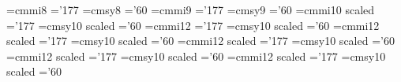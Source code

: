 \font\eighti=cmmi8 \skewchar\eighti='177
\font\eightsy=cmsy8 \skewchar\eightsy='60
%
%
\font\ninei=cmmi9 \skewchar\ninei='177
\font\ninesy=cmsy9 \skewchar\ninesy='60
%
%
\font\eleveni=cmmi10 scaled \magstephalf \skewchar\eleveni='177
\font\elevensy=cmsy10 scaled \magstephalf \skewchar\elevensy='60
%
%
\font\twelvei=cmmi12 \skewchar\twelvei='177
\font\twelvesy=cmsy10 scaled  \skewchar\twelvesy='60
%
%
\font\frti=cmmi12 scaled  \skewchar\frti='177
\font\frtsy=cmsy10 scaled  \skewchar\frtsy='60
%
%
\font\svti=cmmi12 scaled  \skewchar\svti='177
\font\svtsy=cmsy10 scaled  \skewchar\svtsy='60
%
%
\font\twtyi=cmmi12 scaled  \skewchar\twtyi='177
\font\twtysy=cmsy10 scaled \skewchar\twtysy='60
%
%
\font\twfvi=cmmi12 scaled  \skewchar\twfvi='177
\font\twfvsy=cmsy10 scaled  \skewchar\twfvsy='60
%
%
\def\Twfvpoint{\normalbaselineskip=30pt
  \def\rm{\fam0\twfvrm}%
  \def\it{\fam\itfam\twfvit}%
  \def\sl{\fam\slfam\twfvsl}%
  \def\bf{\fam\bffam\twfvbf}%
  \def\smc{\twfvrm}%
  \def\mit{\fam 1}%
  \def\cal{\fam 2}%
  \textfont0=\twfvrm   \scriptfont0=\twtyrm   \scriptscriptfont0=\svtrm
  \textfont1=\twfvi    \scriptfont1=\twtyi    \scriptscriptfont1=\svti
  \textfont2=\twfvsy   \scriptfont2=\twtysy   \scriptscriptfont2=\svtsy
  \textfont3=\tenex   \scriptfont3=\tenex     \scriptscriptfont3=\tenex
  \textfont\itfam=\twfvit \scriptfont\itfam=\twtyit
  \textfont\slfam=\twfvsl \scriptfont\slfam=\twtysl
  \textfont\bffam=\twfvbf \scriptfont\bffam=\twtybf
  \scriptscriptfont\bffam=\twtybf
  \setbox\strutbox=\hbox{\vrule height 22pt depth 8pt width 0pt}%
  \def\tt{\twfvtt}\normalbaselines\rm
}
\def\twfvpoint{\Twfvpoint}
%
\def\Twtypoint{\normalbaselineskip=25pt
  \def\rm{\fam0\twtyrm}%
  \def\it{\fam\itfam\twtyit}%
  \def\sl{\fam\slfam\twtysl}%
  \def\bf{\fam\bffam\twtybf}%
  \def\smc{\twtyrm}%
  \def\mit{\fam 1}%
  \def\cal{\fam 2}%
  \textfont0=\twtyrm   \scriptfont0=\svtrm   \scriptscriptfont0=\frtrm
  \textfont1=\twtyi    \scriptfont1=\svti    \scriptscriptfont1=\frti
  \textfont2=\twtysy   \scriptfont2=\svtsy   \scriptscriptfont2=\frtsy
  \textfont3=\tenex   \scriptfont3=\tenex     \scriptscriptfont3=\tenex
  \textfont\itfam=\twtyit \scriptfont\itfam=\svtit
  \textfont\slfam=\twtysl \scriptfont\slfam=\svtsl
  \textfont\bffam=\twtybf \scriptfont\bffam=\svtbf
  \scriptscriptfont\bffam=\svtbf
  \setbox\strutbox=\hbox{\vrule height 18pt depth 7pt width 0pt}%
  \def\tt{\twtytt}\normalbaselines\rm}
